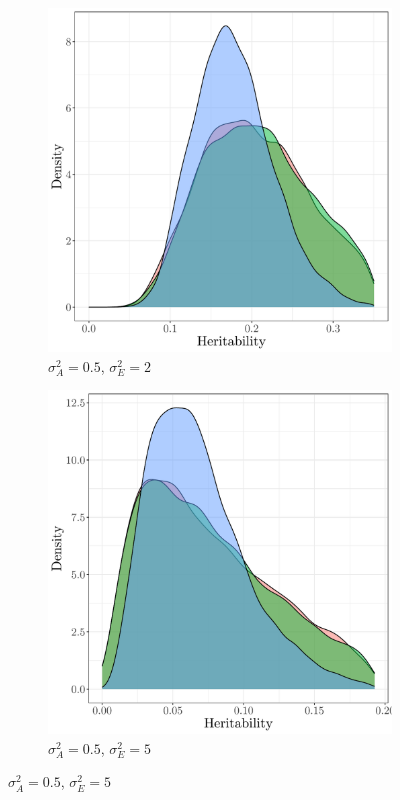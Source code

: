 \begin{figure}[H]
    \centering
    \begin{subfigure}{0.49\textwidth}
        \caption{$\sigma^2_A=0.5$, $\sigma^2_E=2$}
        \includegraphics[width=\linewidth]{figures/overdispersion_vE-vA_2-0.5.pdf}
    \end{subfigure}
    \begin{subfigure}{0.49\textwidth}
        \caption{$\sigma^2_A=0.5$, $\sigma^2_E=5$}
        \includegraphics[width=\linewidth]{figures/overdispersion_vE-vA_5-0.5.pdf}

\end{subfigure}
\end{figure}
